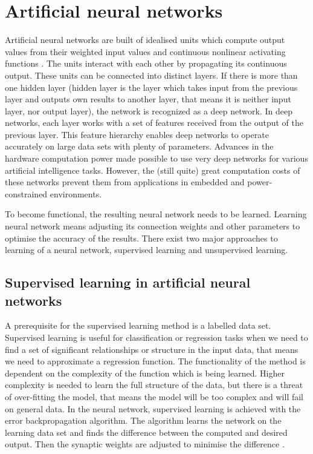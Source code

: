 \section{Artificial neural networks}
Artificial neural networks are built of idealised units which compute output values from their weighted input values and continuous nonlinear activating functions \cite{tavanaeiDeepLearningSpiking2019}. The units interact with each other by propagating its continuous output. These units can be connected into distinct layers. If there is more than one hidden layer (hidden layer is the layer which takes input from the previous layer and outputs own results to another layer, that means it is neither input layer, nor output layer), the network is recognized as a deep network. In deep networks, each layer works with a set of features received from the output of the previous layer. This feature hierarchy enables deep networks to operate accurately on large data sets with plenty of parameters. Advances in the hardware computation power made possible to use very deep networks for various artificial intelligence tasks. However, the (still quite) great computation costs of these networks prevent them from applications in embedded and power-constrained environments. \par
To become functional, the resulting neural network needs to be learned. Learning neural network means adjusting its connection weights and other parameters to optimise the accuracy of the results. There exist two major approaches to learning of a neural network, supervised learning and unsupervised learning. \par

\subsection{Supervised learning in artificial neural networks}
A prerequisite for the supervised learning method is a labelled data set. Supervised learning is useful for classification or regression tasks when we need to find a set of significant relationships or structure in the input data, that means we need to approximate a regression function. The functionality of the method is dependent on the complexity of the function which is being learned. Higher complexity is needed to learn the full structure of the data, but there is a threat of over-fitting the model, that means the model will be too complex and will fail on general data. In the neural network, supervised learning is achieved with the error backpropagation algorithm. The algorithm learns the network on the learning data set and finds the difference between the computed and desired output. Then the synaptic weights are adjusted to minimise the difference \cite{sathyaComparisonSupervisedUnsupervised2013}.

